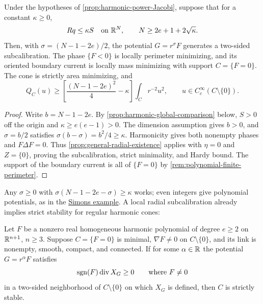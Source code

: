 \begin{corollary}
\label{cor:harmonic-radial-existence}\label{main:harmonic-radial}
Under the hypotheses of \cref{prop:harmonic-power-Jacobi}, suppose that
for a constant \(\kappa\ge0\),
\begin{equation}\label{eq:harmonic-radial-bound}
 Rq\le\kappa S\quad\hbox{on }\mathbb R^N,\qquad
 N\ge2e+1+2\sqrt\kappa.
\end{equation}
Then, with \(\sigma=(N-1-2e)/2\), the potential \(G=r^\sigma F\)
generates a two-sided subcalibration. The phase \(\{F<0\}\) is locally
perimeter minimizing, and its oriented boundary current is locally
mass minimizing with support \(C=\{F=0\}\). The cone is strictly
area minimizing, and
\begin{equation}\label{eq:harmonic-radial-Hardy}
 Q_C(u)\ge\left[\frac{(N-1-2e)^2}{4}-\kappa\right]
 \int_Cr^{-2}u^2,
 \qquad u\in C_c^\infty(C\setminus\{0\}).
\end{equation}
\end{corollary}

\begin{proof}
Write \(b=N-1-2e\). By
\cref{prop:harmonic-global-comparison} below,
\(S>0\) off the origin and \(\kappa\ge e(e-1)>0\).
The dimension assumption gives \(b>0\), and
\(\sigma=b/2\) satisfies
\(\sigma(b-\sigma)=b^2/4\ge\kappa\).
Harmonicity gives both nonempty phases and
\(F\Delta F=0\). Thus \cref{prop:general-radial-existence}
applies with \(\eta=0\) and \(Z=\{0\}\), proving the
subcalibration, strict minimality, and Hardy bound.
The support of the boundary current is all of \(\{F=0\}\)
by \cref{rem:polynomial-finite-perimeter}.
\end{proof}

Any \(\sigma\ge0\) with \(\sigma(N-1-2e-\sigma)\ge\kappa\)
works; even integers give polynomial potentials, as in the
\hyperref[par:Simons-degree-example]{Simons example}. A local radial
subcalibration already implies strict stability for regular harmonic cones:

\begin{corollary}
\label{cor:harmonic-radial-strict-stability}
Let $F$ be a nonzero real homogeneous harmonic polynomial
of degree $e\ge2$ on $\mathbb R^{n+1}$, $n\ge3$. Suppose $C=\{F=0\}$
is minimal, $\nabla F\ne0$ on $C\setminus\{0\}$, and its link
is nonempty, smooth, compact, and connected. If for some
$\alpha\in\mathbb R$ the potential $G=r^\alpha F$ satisfies
\[
 \operatorname{sgn}(F)\operatorname{div} X_G\ge0\qquad\text{where }F\ne0
\]
in a two-sided neighborhood of $C\setminus\{0\}$ on which $X_G$
is defined, then $C$ is strictly stable.
\end{corollary}

